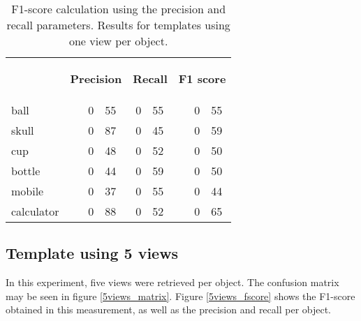 \begin{table}[H]
\centering
\begin{tabular} {l l r@{.}l r@{.}l l r@{.}l }
\toprule
\addlinespace[3mm]
   \multicolumn{1}{c}{\begin{center}\textbf{Object}\end{center}} &
   \multicolumn{3}{c}{\begin{flushright}\textbf{Precision}\end{flushright}} &
   \multicolumn{2}{c}{\begin{flushright}\textbf{Recall}\end{flushright}} &
   \multicolumn{3}{c}{\begin{flushright}\hspace*{0.2cm}\textbf{F1 score}\end{flushright}} &\\
\addlinespace[-3mm]

\midrule
ball		&&	0&55 	&	0&55	&&	0&55	\\
skull		&&	0&87	&	0&45	&&	0&59	\\
cup			&&	0&48	&	0&52	&&	0&50	\\
bottle		&&	0&44	&	0&59	&&	0&50	\\
mobile		&&	0&37	&	0&55	&&	0&44	\\
calculator	&&	0&88	&	0&52	&&	0&65	\\


\bottomrule
\end{tabular}
\caption[F1-score - templates using 1 view]{F1-score calculation using the precision and recall parameters. Results for templates using one view per object. }
\label{1view_fscore}

\end{table}




\subsection{Template using 5 views}
In this experiment, five views were retrieved per object. 
The confusion matrix may be seen in figure \ref{5views_matrix}. 
Figure \ref{5views_fscore} shows the F1-score obtained in this measurement, as well as the precision and recall per object. 

